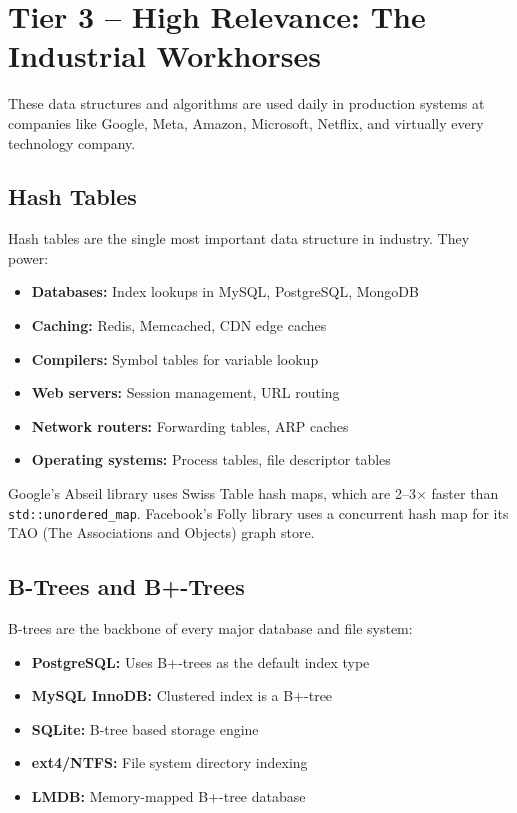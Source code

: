 
\section{Tier 3 -- High Relevance: The Industrial Workhorses}

These data structures and algorithms are used daily in production systems at companies like Google, Meta, Amazon, Microsoft, Netflix, and virtually every technology company.

\subsection{Hash Tables}

Hash tables are the single most important data structure in industry. They power:
\begin{itemize}
    \item \textbf{Databases:} Index lookups in MySQL, PostgreSQL, MongoDB
    \item \textbf{Caching:} Redis, Memcached, CDN edge caches
    \item \textbf{Compilers:} Symbol tables for variable lookup
    \item \textbf{Web servers:} Session management, URL routing
    \item \textbf{Network routers:} Forwarding tables, ARP caches
    \item \textbf{Operating systems:} Process tables, file descriptor tables
\end{itemize}

Google's Abseil library uses Swiss Table hash maps, which are 2--3$\times$ faster than \texttt{std::unordered\_map}. Facebook's Folly library uses a concurrent hash map for its TAO (The Associations and Objects) graph store.

\subsection{B-Trees and B+-Trees}

B-trees are the backbone of every major database and file system:
\begin{itemize}
    \item \textbf{PostgreSQL:} Uses B+-trees as the default index type
    \item \textbf{MySQL InnoDB:} Clustered index is a B+-tree
    \item \textbf{SQLite:} B-tree based storage engine
    \item \textbf{ext4/NTFS:} File system directory indexing
    \item \textbf{LMDB:} Memory-mapped B+-tree database
\end{itemize}

